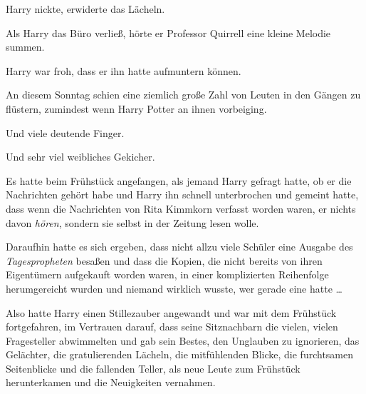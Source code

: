 Harry nickte, erwiderte das Lächeln.

Als Harry das Büro verließ, hörte er Professor Quirrell eine kleine Melodie summen.

Harry war froh, dass er ihn hatte aufmuntern können.

\later

An diesem Sonntag schien eine ziemlich große Zahl von Leuten in den Gängen zu flüstern, zumindest wenn Harry Potter an ihnen vorbeiging.

Und viele deutende Finger.

Und sehr viel weibliches Gekicher.

Es hatte beim Frühstück angefangen, als jemand Harry gefragt hatte, ob er die Nachrichten gehört habe und Harry ihn schnell unterbrochen und gemeint hatte, dass wenn die Nachrichten von Rita Kimmkorn verfasst worden waren, er nichts davon \emph{hören}, sondern sie selbst in der Zeitung lesen wolle.

Daraufhin hatte es sich ergeben, dass nicht allzu viele Schüler eine Ausgabe des \emph{Tagespropheten} besaßen und dass die Kopien, die nicht bereits von ihren Eigentümern aufgekauft worden waren, in einer komplizierten Reihenfolge herumgereicht wurden und niemand wirklich wusste, wer gerade eine hatte …

Also hatte Harry einen Stillezauber angewandt und war mit dem Frühstück fortgefahren, im Vertrauen darauf, dass seine Sitznachbarn die vielen, vielen Fragesteller abwimmelten und gab sein Bestes, den Unglauben zu ignorieren, das Gelächter, die gratulierenden Lächeln, die mitfühlenden Blicke, die furchtsamen Seitenblicke und die fallenden Teller, als neue Leute zum Frühstück herunterkamen und die Neuigkeiten vernahmen.

